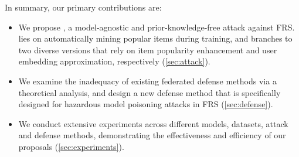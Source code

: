 In summary, our primary contributions are:
\begin{itemize}[leftmargin=*]
\item We propose \model{}, a model-agnostic and prior-knowledge-free attack against FRS. \model{} lies on automatically mining popular items during training, and branches to two diverse versions that rely on item popularity enhancement and user embedding approximation, respectively (\cref{sec:attack}).
\item We examine the inadequacy of existing federated defense methods via a theoretical analysis, and design a new defense method that is specifically designed for hazardous model poisoning attacks in FRS (\cref{sec:defense}).
\item We conduct extensive experiments across different models, datasets, attack and defense methods, demonstrating the effectiveness and efficiency of our proposals (\cref{sec:experiments}).
\end{itemize}
